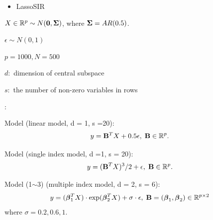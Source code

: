 \documentclass[mathserif,11pt]{beamer}
\def\lyxframeend{} %
\newcommand{\RNum}[1]{\uppercase\expandafter{\romannumeral #1\relax}}
\begin{document}
\begin{itemize}
	\item LassoSIR\footnotemark
\end{itemize}


\lyxframeend


\begin{itemize}
	{\small
		\item $X\in \mathbb{R}^p \sim N(\mathbf{0}, \boldsymbol{\Sigma})$, where $\boldsymbol{\Sigma} = AR(0.5)$.
		\item $\epsilon \sim N(0,1)$
		\item $p = 1000, N = 500$
		\item $d:$ dimension of central subspace
		\item $s:$ the number of non-zero variables in rows
		\item {}:
		\begin{itemize}
			{\footnotesize
				\item[--] Model \RNum{1} (linear model, d = 1, s =20): 	
				\[
					y = \mathbf{B}^T X + 0.5\epsilon, \; \mathbf{B} \in \mathbb{R}^p.
				\]
				\item[--] Model \RNum{2} (single index model, d =1, s = 20):
				\[
					y = (\mathbf{B}^T X)^3/2 + \epsilon, \; \mathbf{B} \in \mathbb{R}^p.
				\]
				\item[--] Model \RNum{3}(1$\sim$3) (multiple index model, d = 2, s = 6):
				\[
						y =  (\boldsymbol{\beta}_1^T X)\cdot \exp(\boldsymbol{\beta}_2^T X) + \sigma \cdot \epsilon,  \; 	\mathbf{B} = (\boldsymbol{\beta}_1, \boldsymbol{\beta}_2)\in \mathbb{R}^{p \times 2}
				\]
				where $\sigma = 0.2,0.6,1.$
			}
		\end{itemize}
		
	}
\end{itemize}
\end{document}
